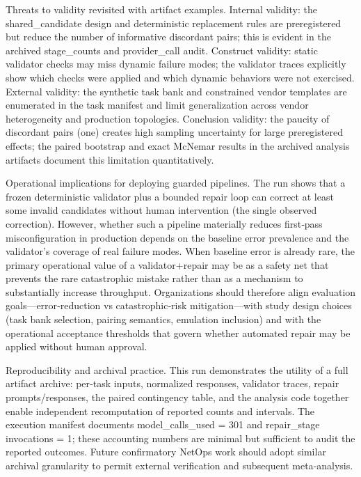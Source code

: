\documentclass[conference]{IEEEtran}
\begin{document}
Threats to validity revisited with artifact examples. Internal validity: the shared\_candidate design and deterministic replacement rules are preregistered but reduce the number of informative discordant pairs; this is evident in the archived stage\_counts and provider\_call audit. Construct validity: static validator checks may miss dynamic failure modes; the validator traces explicitly show which checks were applied and which dynamic behaviors were not exercised. External validity: the synthetic task bank and constrained vendor templates are enumerated in the task manifest and limit generalization across vendor heterogeneity and production topologies. Conclusion validity: the paucity of discordant pairs (one) creates high sampling uncertainty for large preregistered effects; the paired bootstrap and exact McNemar results in the archived analysis artifacts document this limitation quantitatively.

Operational implications for deploying guarded pipelines. The run shows that a frozen deterministic validator plus a bounded repair loop can correct at least some invalid candidates without human intervention (the single observed correction). However, whether such a pipeline materially reduces first‑pass misconfiguration in production depends on the baseline error prevalence and the validator's coverage of real failure modes. When baseline error is already rare, the primary operational value of a validator+repair may be as a safety net that prevents the rare catastrophic mistake rather than as a mechanism to substantially increase throughput. Organizations should therefore align evaluation goals---error‑reduction vs catastrophic‑risk mitigation---with study design choices (task bank selection, pairing semantics, emulation inclusion) and with the operational acceptance thresholds that govern whether automated repair may be applied without human approval.

Reproducibility and archival practice. This run demonstrates the utility of a full artifact archive: per‑task inputs, normalized responses, validator traces, repair prompts/responses, the paired contingency table, and the analysis code together enable independent recomputation of reported counts and intervals. The execution manifest documents model\_calls\_used = 301 and repair\_stage invocations = 1; these accounting numbers are minimal but sufficient to audit the reported outcomes. Future confirmatory NetOps work should adopt similar archival granularity to permit external verification and subsequent meta‑analysis.
\end{document}
